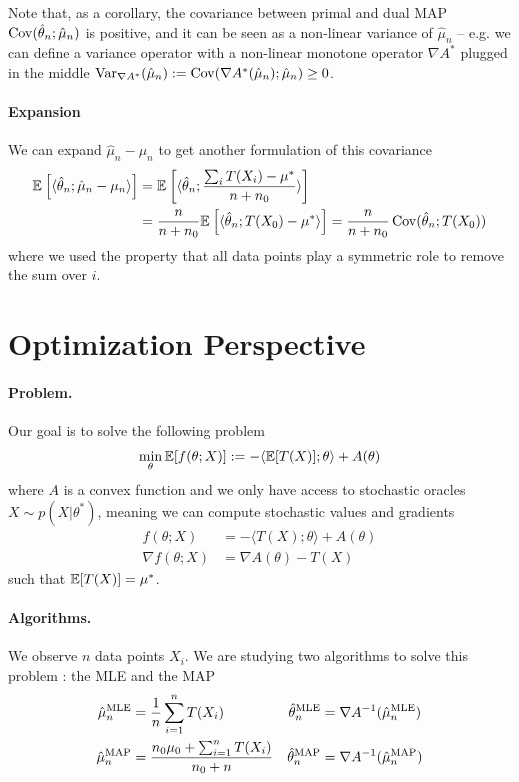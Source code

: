 \documentclass{article}
\newcommand*{\expect}[2][]{\ensuremath{\mathbb{E}_{#1} \left[ #2 \right] }} %
\newcommand{\logpart}{A}
\newcommand{\conj}{\logpart^*}
\newcommand{\natp}{\theta}
\newcommand{\MAPm}{\hat \mu_n}
\newcommand{\MAPt}{\hat \natp_n}
\begin{document}
Note that, as a corollary, the covariance between primal and dual MAP
$\Cov(\hat \natp_n ; \hat \mu_n )$ is positive, and it can be seen as a non-linear variance of $\hat \mu_n$ -- e.g. we can define a variance operator with a non-linear monotone operator $\nabla\conj$ plugged in the middle $\Var_{\nabla \conj}(\hat \mu_n) := \Cov(\nabla\conj(\hat \mu_n) ; \hat \mu_n ) \geq 0$.

\paragraph{Expansion}
We can expand  $\hat \mu_n - \mu_n$ to get another formulation of this covariance
\begin{align}
	\expect{\langle \hat \natp_n ; \hat \mu_n - \mu_n \rangle}
	&= \expect{\langle \hat \natp_n ; \frac{\sum_i T(X_i) - \mu^*}{n+n_0} \rangle}  \\
	& = \frac{n}{n+n_0} \expect{\langle \hat \natp_n ; T(X_0) - \mu^*\rangle}
	= \frac{n}{n+n_0} \Cov(\hat \natp_n ; T(X_0) ) 
\end{align}
where we used the property that all data points play a symmetric role to remove the sum over $i$.

\clearpage

\section{Optimization Perspective}
\paragraph{Problem.}
Our goal is to solve the following problem
\begin{align}
	\min_\natp \E[f(\natp ; X)] := -\langle \E[T(X)] ; \natp \rangle + \logpart(\natp)
\end{align}
where $\logpart$ is a convex function and we only have access to stochastic oracles $X \sim p(X | \natp^*)$, meaning we can compute stochastic values and gradients 
\begin{align}
	f(\natp ; X) &= -\langle T(X) ; \natp \rangle + \logpart(\natp) \\
	\nabla f(\natp ; X) &= \nabla \logpart(\natp) - T(X)
\end{align}
such that $\operatorname{\mathbb{E}}[T(X)] = \mu^*$.

\paragraph{Algorithms.}
We observe $n$ data points $X_i$. 
We are studying two algorithms to solve this problem : the MLE and the MAP
\begin{align}
	\MAPm^\text{MLE} &= \inv{n}\sum_{i=1}^n T(X_i) 
	&\MAPt^\text{MLE} &= \nabla\logpart^{-1}(\MAPm^\text{MLE}) \\
	\MAPm^\text{MAP} &= \frac{n_0\mu_0 + \smallsum_{i=1}^n T(X_i)}{n_0 + n}
	&\MAPt^\text{MAP} &= \nabla\logpart^{-1}(\MAPm^\text{MAP})	
\end{align}
\end{document}
